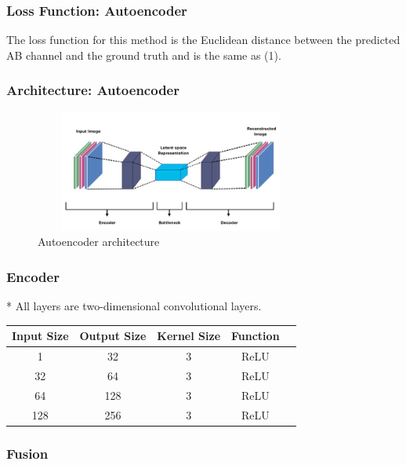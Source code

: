 \documentclass{article}
\begin{document}

\subsubsection{Loss Function: Autoencoder}
The loss function for this method is the Euclidean distance between the predicted AB channel and the ground truth and is the same as (1).


\subsubsection{Architecture: Autoencoder}


\begin{figure}[htbp!]
    \centering
        \includegraphics[width=9cm, height=4cm]{autoencoder.jpg}
        \caption{Autoencoder architecture}
    \end{figure}

\subsubsection{Encoder}
* All layers are two-dimensional convolutional layers.

\begin{center}
\begin{tabular}{ |c|c|c|c|c| } 
\hline
Input Size & Output Size & Kernel Size & Function  \\
\hline
1 & 32 & 3 & ReLU \\ 
32 & 64 & 3 & ReLU  \\ 
64 & 128 & 3 & ReLU \\ 
128 & 256 & 3 & ReLU \\ 

\hline
\end{tabular}
\end{center}

\subsubsection{Fusion}
\end{document}
